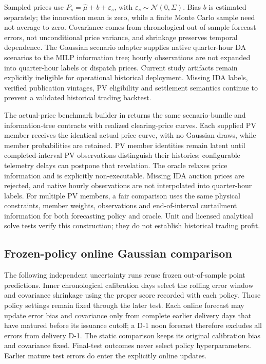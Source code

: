 \documentclass[11pt,a4paper]{article}
\begin{document}
Sampled prices use $P_s=\widehat\mu+b+\varepsilon_s$, with $\varepsilon_s\sim\mathcal N(0,\Sigma)$. Bias $b$ is estimated separately; the innovation mean is zero, while a finite Monte Carlo sample need not average to zero. Covariance comes from chronological out-of-sample forecast errors, not unconditional price variance, and shrinkage preserves temporal dependence. The Gaussian scenario adapter supplies native quarter-hour DA scenarios to the MILP information tree; hourly observations are not expanded into quarter-hour labels or dispatch prices. Current study artifacts remain explicitly ineligible for operational historical deployment. Missing IDA labels, verified publication vintages, PV eligibility and settlement semantics continue to prevent a validated historical trading backtest.

The actual-price benchmark builder in  returns the same scenario-bundle and information-tree contracts with realized clearing-price curves. Each supplied PV member receives the identical actual price curve, with no Gaussian draws, while member probabilities are retained. PV member identities remain latent until completed-interval PV observations distinguish their histories; configurable telemetry delays can postpone that revelation. The oracle relaxes price information and is explicitly non-executable. Missing IDA auction prices are rejected, and native hourly observations are not interpolated into quarter-hour labels. For multiple PV members, a fair comparison uses the same physical constraints, member weights, observations and end-of-interval curtailment information for both forecasting policy and oracle. Unit and licensed analytical solve tests verify this construction; they do not establish historical trading profit.
\subsection{Frozen-policy online Gaussian comparison}

The following independent uncertainty runs reuse frozen out-of-sample point predictions. Inner chronological calibration days select the rolling error window and covariance shrinkage using the proper score recorded with each policy. Those policy settings remain fixed through the later test. Each online forecast may update error bias and covariance only from complete earlier delivery days that have matured before its issuance cutoff; a D-1 noon forecast therefore excludes all errors from delivery D-1. The static comparison keeps its original calibration bias and covariance fixed. Final-test outcomes never select policy hyperparameters. Earlier mature test errors do enter the explicitly online updates.
\end{document}
